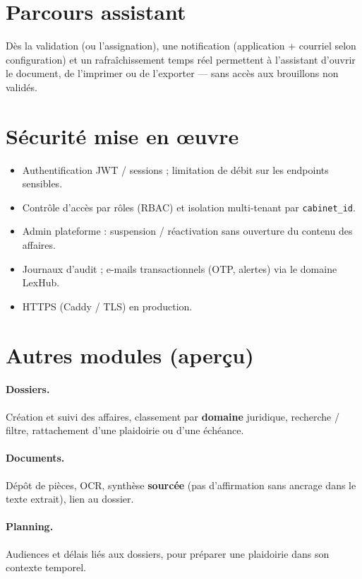 \section{Parcours assistant}

Dès la validation (ou l'assignation), une notification (application + courriel selon configuration) et un rafraîchissement temps réel permettent à l'assistant d'ouvrir le document, de l'imprimer ou de l'exporter --- sans accès aux brouillons non validés.

\section{Sécurité mise en œuvre}

\begin{itemize}[leftmargin=1.4em]
  \item Authentification JWT / sessions ; limitation de débit sur les endpoints sensibles.
  \item Contrôle d'accès par rôles (RBAC) et isolation multi-tenant par \texttt{cabinet\_id}.
  \item Admin plateforme : suspension / réactivation sans ouverture du contenu des affaires.
  \item Journaux d'audit ; e-mails transactionnels (OTP, alertes) via le domaine LexHub.
  \item HTTPS (Caddy / TLS) en production.
\end{itemize}

\section{Autres modules (aperçu)}

\paragraph{Dossiers.}
Création et suivi des affaires, classement par \textbf{domaine} juridique, recherche / filtre, rattachement d'une plaidoirie ou d'une échéance.

\paragraph{Documents.}
Dépôt de pièces, OCR, synthèse \textbf{sourcée} (pas d'affirmation sans ancrage dans le texte extrait), lien au dossier.

\paragraph{Planning.}
Audiences et délais liés aux dossiers, pour préparer une plaidoirie dans son contexte temporel.

